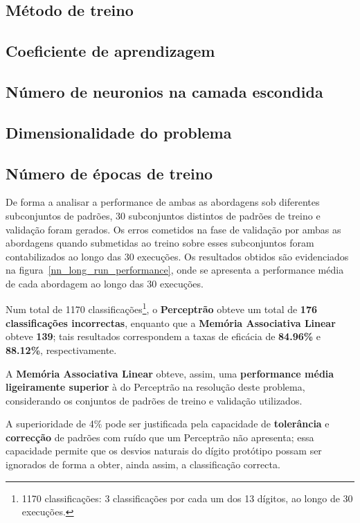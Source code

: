 \documentclass{article}
\begin{document}
\subsection{Método de treino}

\subsection{Coeficiente de aprendizagem}

\subsection{Número de neuronios na camada escondida}

\subsection{Dimensionalidade do problema}

\subsection{Número de épocas de treino}



De forma a analisar a performance de ambas as abordagens sob diferentes subconjuntos de padrões, 30 subconjuntos distintos de padrões de treino e validação foram gerados. Os erros cometidos na fase de validação por ambas as abordagens quando submetidas ao treino sobre esses subconjuntos foram contabilizados ao longo das 30 execuções. Os resultados obtidos são evidenciados na figura~\ref{nn_long_run_performance}, onde se apresenta a performance média de cada abordagem ao longo das 30 execuções.



Num total de 1170 classificações\footnote{1170 classificações: 3 classificações por cada um dos 13 dígitos, ao longo de 30 execuções.}, o \textbf{Perceptrão} obteve um total de \textbf{176 classificações incorrectas}, enquanto que a \textbf{Memória Associativa Linear} obteve \textbf{139}; tais resultados correspondem a taxas de eficácia de \textbf{84.96\%} e \textbf{88.12\%}, respectivamente.

A \textbf{Memória Associativa Linear} obteve, assim, uma \textbf{performance média ligeiramente superior} à do Perceptrão na resolução deste problema, considerando os conjuntos de padrões de treino e validação utilizados.

A superioridade de 4\% pode ser justificada pela capacidade de \textbf{tolerância} e \textbf{correcção} de padrões com ruído que um Perceptrão não apresenta; essa capacidade permite que os desvios naturais do dígito protótipo possam ser ignorados de forma a obter, ainda assim, a classificação correcta.
\end{document}
